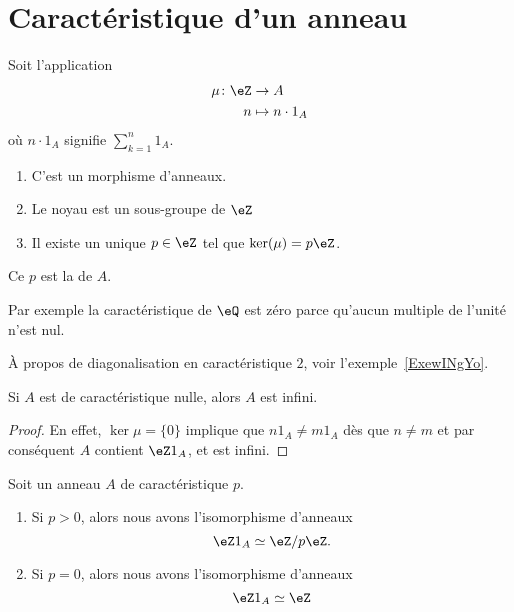 \section{Caractéristique d'un anneau}

\begin{lemmaDef}        \label{LEMDEFooVEWZooUrPaDw}
	Soit l'application
	\begin{equation}
		\begin{aligned}
			\mu\colon \eZ & \to A              \\
			n             & \mapsto n\cdot 1_A
		\end{aligned}
	\end{equation}
	où \( n\cdot 1_A\) signifie \( \sum_{k=1}^n1_A\).
	\begin{enumerate}
		\item
		      C'est un morphisme d'anneaux.
		\item
		      Le noyau est un sous-groupe de \( \eZ\)
		\item
		      Il existe un unique \( p\in \eZ\) tel que \( \ker(\mu)=p\eZ\).
	\end{enumerate}
	Ce \( p\) est la  de \( A\).
\end{lemmaDef}

Par exemple la caractéristique de \( \eQ\) est zéro parce qu'aucun multiple de l'unité n'est nul.

À propos de diagonalisation en caractéristique \( 2\), voir l'exemple~\ref{ExewINgYo}.

\begin{lemma}
	Si \( A\) est de caractéristique nulle, alors \( A\) est infini.
\end{lemma}

\begin{proof}
	En effet, \( \ker\mu=\{0\} \) implique que \( n1_A \neq  m1_A\) dès que \(n \neq m \) et par conséquent \( A\) contient \(\eZ 1_A \), et  est infini.
\end{proof}

\begin{lemma}       \label{LemHmDaYH}
    Soit un anneau \( A\) de caractéristique \( p\).
    \begin{enumerate}
        \item       \label{ITEMooPKSEooPKChGM}
     Si \( p>0\), alors nous avons l'isomorphisme d'anneaux
	\begin{equation}
		\eZ 1_A\simeq\eZ/p\eZ.
	\end{equation}
\item        \label{ITEMooBTUIooYzOycc}
                   Si \( p=0\), alors nous avons l'isomorphisme d'anneaux
	\begin{equation}
		\eZ 1_A\simeq \eZ
	\end{equation}
        \end{enumerate}
\end{lemma}

